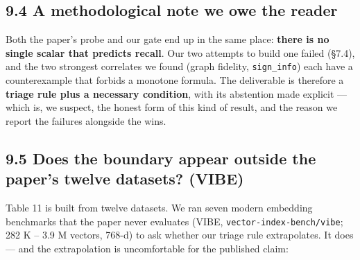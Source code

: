 \documentclass[
  10pt,
]{article}
\begin{document}
\subsection{9.4 A methodological note we owe the
reader}\label{a-methodological-note-we-owe-the-reader}

Both the paper's probe and our gate end up in the same place:
\textbf{there is no single scalar that predicts recall}. Our two
attempts to build one failed (§7.4), and the two strongest correlates we
found (graph fidelity, \texttt{sign\_info}) each have a counterexample
that forbids a monotone formula. The deliverable is therefore a
\textbf{triage rule plus a necessary condition}, with its abstention
made explicit --- which is, we suspect, the honest form of this kind of
result, and the reason we report the failures alongside the wins.

\subsection{9.5 Does the boundary appear outside the paper's twelve
datasets?
(VIBE)}\label{does-the-boundary-appear-outside-the-papers-twelve-datasets-vibe}

Table 11 is built from twelve datasets. We ran seven modern embedding
benchmarks that the paper never evaluates (VIBE,
\texttt{vector-index-bench/vibe}; 282 K -- 3.9 M vectors, 768-d) to ask
whether our triage rule extrapolates. It does --- and the extrapolation
is uncomfortable for the published claim:
\end{document}
